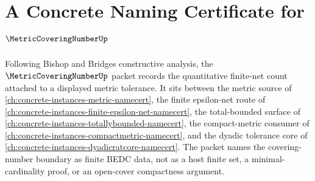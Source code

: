 \chapter{A Concrete Naming Certificate for $\MetricCoveringNumberUp$}
\label{ch:concrete-instances-metric-covering-number-namecert}

Following Bishop and Bridges constructive analysis, the $\MetricCoveringNumberUp$ packet records the quantitative finite-net count attached to a displayed metric tolerance. It sits between the metric source of \autoref{ch:concrete-instances-metric-namecert}, the finite epsilon-net route of \autoref{ch:concrete-instances-finite-epsilon-net-namecert}, the total-bounded surface of \autoref{ch:concrete-instances-totallybounded-namecert}, the compact-metric consumer of \autoref{ch:concrete-instances-compactmetric-namecert}, and the dyadic tolerance core of \autoref{ch:concrete-instances-dyadicratcore-namecert}. The packet names the covering-number boundary as finite BEDC data, not as a host finite set, a minimal-cardinality proof, or an open-cover compactness argument.

